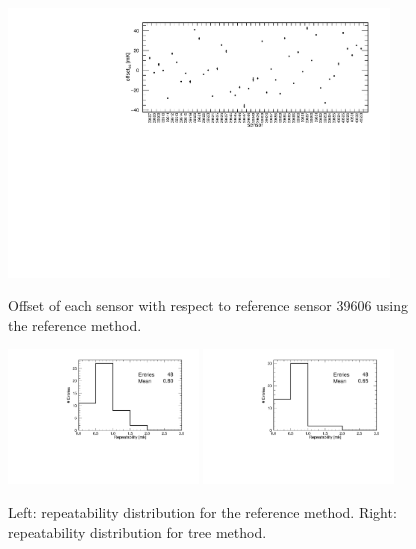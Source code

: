 \begin{figure}[htbp]
\centering
{\includegraphics[width=0.9\textwidth]{images/figure_13.pdf}}
\caption{Offset of each sensor with respect to reference sensor 39606 using the reference method.}
\label{fig:offsets_tree_1}
\end{figure}

\begin{figure}[htbp]
\centering
{\includegraphics[width=0.45\textwidth]{images/figure_14_a.pdf}}
{\includegraphics[width=0.45\textwidth]{images/figure_14_b.pdf}}
\caption{Left: repeatability distribution for the reference method. Right: repeatability distribution for tree method.}
\label{fig:offsets_tree_2}
\end{figure}

